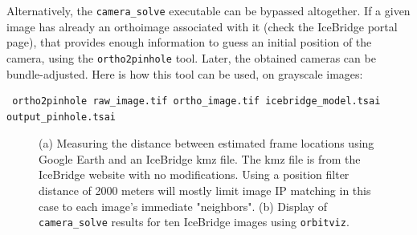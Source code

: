 Alternatively, the \texttt{camera\_solve} executable can be bypassed
altogether.  If a given image has already an orthoimage associated with
it (check the IceBridge portal page), that provides enough information
to guess an initial position of the camera, using the
\texttt{ortho2pinhole} tool. Later, the obtained cameras can be
bundle-adjusted. Here is how this tool can be used, on grayscale images:

\begin{verbatim}
 ortho2pinhole raw_image.tif ortho_image.tif icebridge_model.tsai output_pinhole.tsai
\end{verbatim}

\begin{figure}[h!]
\centering
  \hfil
\caption{(a) Measuring the distance between estimated frame locations using Google Earth
and an IceBridge kmz file.  The kmz file is from the IceBridge website with no modifications.
Using a position filter distance of 2000 meters will mostly limit image IP matching
in this case to each image's immediate "neighbors".  (b) Display of \texttt{camera\_solve}
results for ten IceBridge images using \texttt{orbitviz}.}
\label{fig:pinhole-icebridge-camera-results}
\end{figure}


